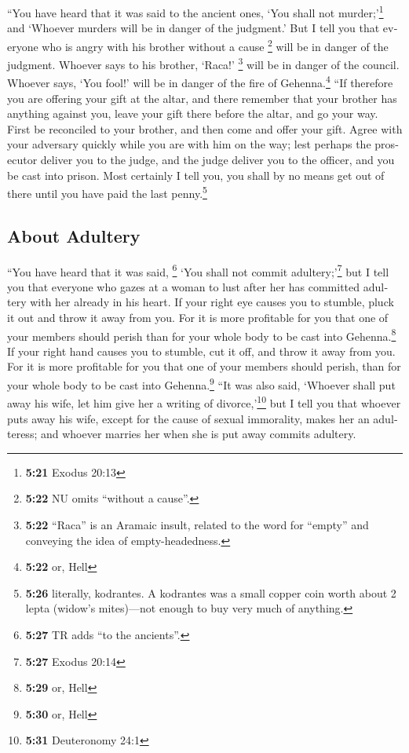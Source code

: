\begin{paracol}{2}
\begin{otherlanguage}{english}
 ``You have heard that it was said to the ancient ones,
`You shall not murder;'\footnote{\textbf{5:21} Exodus 20:13} and
`Whoever murders will be in danger of the judgment.'  But
I tell you that everyone who is angry with his brother without a cause
\footnote{\textbf{5:22} NU omits ``without a cause''.} will be in danger
of the judgment. Whoever says to his brother, `Raca!' \footnote{\textbf{5:22}
  ``Raca'' is an Aramaic insult, related to the word for ``empty'' and
  conveying the idea of empty-headedness.} will be in danger of the
council. Whoever says, `You fool!' will be in danger of the fire of
Gehenna.\footnote{\textbf{5:22} or, Hell}  ``If therefore
you are offering your gift at the altar, and there remember that your
brother has anything against you,  leave your gift there
before the altar, and go your way. First be reconciled to your brother,
and then come and offer your gift.  Agree with your
adversary quickly while you are with him on the way; lest perhaps the
prosecutor deliver you to the judge, and the judge deliver you to the
officer, and you be cast into prison.  Most certainly I
tell you, you shall by no means get out of there until you have paid the
last penny.\footnote{\textbf{5:26} literally, kodrantes. A kodrantes was
  a small copper coin worth about 2 lepta (widow's mites)---not enough
  to buy very much of anything.}

\hypertarget{about-adultery}{%
\subsection{About Adultery}\label{about-adultery}}

 ``You have heard that it was said, \footnote{\textbf{5:27}
  TR adds ``to the ancients''.} `You shall not commit
adultery;'\footnote{\textbf{5:27} Exodus 20:14}  but I
tell you that everyone who gazes at a woman to lust after her has
committed adultery with her already in his heart.  If
your right eye causes you to stumble, pluck it out and throw it away
from you. For it is more profitable for you that one of your members
should perish than for your whole body to be cast into
Gehenna.\footnote{\textbf{5:29} or, Hell}  If your right
hand causes you to stumble, cut it off, and throw it away from you. For
it is more profitable for you that one of your members should perish,
than for your whole body to be cast into Gehenna.\footnote{\textbf{5:30}
  or, Hell}  ``It was also said, `Whoever shall put away
his wife, let him give her a writing of divorce,'\footnote{\textbf{5:31}
  Deuteronomy 24:1}  but I tell you that whoever puts
away his wife, except for the cause of sexual immorality, makes her an
adulteress; and whoever marries her when she is put away commits
adultery.


\end{otherlanguage}
\end{paracol}
